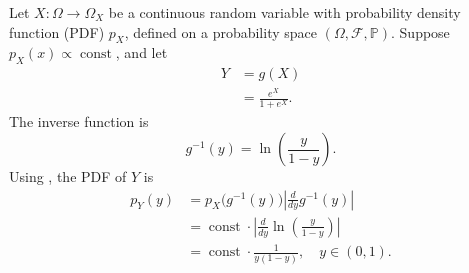 \begin{example}
	Let $X\colon \Omega \to \Omega_X$ be a continuous random variable with probability density function (PDF) $p_X$, defined on a probability space $(\Omega, \mathcal{F}, \mathbb{P})$. Suppose $p_X(x) \propto \operatorname{const}$, and let
	\begin{equation}
		\begin{split}
			Y &= g(X)\\
			& = \frac{e^X}{1 + e^X}.
		\end{split}
	\end{equation}
	The inverse function is
	\begin{equation}
		g^{-1}(y) = \ln\left(\frac{y}{1-y}\right).
	\end{equation}
	Using , the PDF of $Y$ is
	\begin{equation}
		\begin{split}
			p_Y(y) &= p_X\bigl(g^{-1}(y)\bigr) \left| \frac{d}{dy} g^{-1}(y) \right| \\
			&= \operatorname{const} \cdot \left| \frac{d}{dy} \ln\left(\frac{y}{1-y}\right) \right| \\
			&= \operatorname{const} \cdot \frac{1}{y(1-y)}, \quad y \in (0,1).
		\end{split}
	\end{equation}
\end{example}


